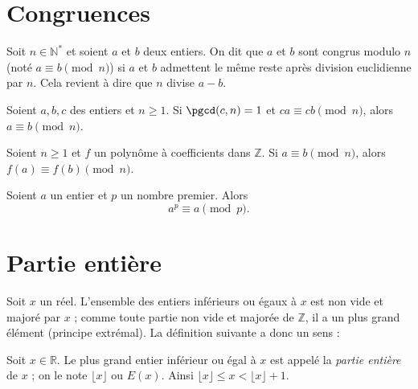 \documentclass[11pt]{article}
\begin{document}

\section{Congruences}\label{sec:congruences}

\begin{definition}
	Soit $n \in \mathbb{N}^*$ et soient $a$ et $b$ deux entiers. On dit que $a$ et $b$ sont congrus modulo $n$ (noté $a \equiv b \pmod{n}$) si $a$ et $b$ admettent le même reste après division euclidienne par $n$. Cela revient à dire que $n$ divise $a - b$.
\end{definition}

\begin{proposition}
	Soient $a, b, c$ des entiers et $n \geq 1$. Si $\pgcd(c, n) = 1$ et $ca \equiv cb \pmod{n}$, alors $a \equiv b \pmod{n}$.
\end{proposition}

\begin{proposition}
	Soient $n \geq 1$ et $f$ un polynôme à coefficients dans $\mathbb{Z}$. Si $a \equiv b \pmod{n}$, alors $f(a) \equiv f(b) \pmod{n}$.
\end{proposition}

\begin{theoreme}
	Soient $a$ un entier et $p$ un nombre premier. Alors
	\[
	a^p \equiv a \pmod{p}.
	\]
\end{theoreme}


\section{Partie entière}\label{sec:partie-entiere}

Soit $x$ un réel. L'ensemble des entiers inférieurs ou égaux à $x$ est non vide et majoré par $x$ ; comme toute partie non vide et majorée de $\mathbb{Z}$, il a un plus grand élément (principe extrémal). La définition suivante a donc un sens :

\begin{definition}
	Soit $x \in \mathbb{R}$. Le plus grand entier inférieur ou égal à $x$ est appelé la \textit{partie entière} de $x$ ; on le note $\lfloor x \rfloor$ ou $E(x).$ Ainsi $\lfloor x \rfloor \leq x < \lfloor x \rfloor + 1.$
\end{definition}
\end{document}
